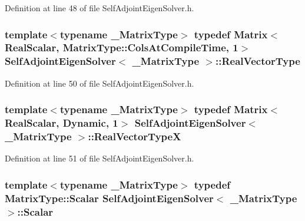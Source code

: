 Definition at line 48 of file Self\-Adjoint\-Eigen\-Solver.\-h.

\hypertarget{class_self_adjoint_eigen_solver_ac519b1b30c0460a1485c38dcd6891d6e}{
\subsubsection[{Real\-Vector\-Type}]{\setlength{\rightskip}{0pt plus 5cm}template$<$typename \-\_\-\-Matrix\-Type$>$ typedef {\bf Matrix}$<${\bf Real\-Scalar}, Matrix\-Type\-::\-Cols\-At\-Compile\-Time, 1$>$ {\bf Self\-Adjoint\-Eigen\-Solver}$<$ \-\_\-\-Matrix\-Type $>$\-::{\bf Real\-Vector\-Type}}}\label{class_self_adjoint_eigen_solver_ac519b1b30c0460a1485c38dcd6891d6e}


Definition at line 50 of file Self\-Adjoint\-Eigen\-Solver.\-h.

\hypertarget{class_self_adjoint_eigen_solver_a44e49c03031e4e3aabc160f237e205f6}{
\subsubsection[{Real\-Vector\-Type\-X}]{\setlength{\rightskip}{0pt plus 5cm}template$<$typename \-\_\-\-Matrix\-Type$>$ typedef {\bf Matrix}$<${\bf Real\-Scalar}, {\bf Dynamic}, 1$>$ {\bf Self\-Adjoint\-Eigen\-Solver}$<$ \-\_\-\-Matrix\-Type $>$\-::{\bf Real\-Vector\-Type\-X}}}\label{class_self_adjoint_eigen_solver_a44e49c03031e4e3aabc160f237e205f6}


Definition at line 51 of file Self\-Adjoint\-Eigen\-Solver.\-h.

\hypertarget{class_self_adjoint_eigen_solver_a54a43d90cec5ee45bed941073e70556f}{
\subsubsection[{Scalar}]{\setlength{\rightskip}{0pt plus 5cm}template$<$typename \-\_\-\-Matrix\-Type$>$ typedef Matrix\-Type\-::\-Scalar {\bf Self\-Adjoint\-Eigen\-Solver}$<$ \-\_\-\-Matrix\-Type $>$\-::{\bf Scalar}}}\label{class_self_adjoint_eigen_solver_a54a43d90cec5ee45bed941073e70556f}


